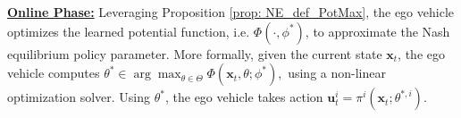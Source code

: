 \vspace{1mm}
\noindent \underline{\textbf{Online Phase:}} Leveraging Proposition \ref{prop: NE_def_PotMax}, the ego vehicle optimizes the learned potential function, i.e. \(\Phi(\cdot, \phi^\ast)\), to approximate the Nash equilibrium policy parameter. More formally, given the current state \(\mathbf{x}_t\), the ego vehicle computes 
\(
    \theta^\ast \in \arg\max_{\theta\in\Theta}\Phi(\mathbf{x}_t, \theta;\phi^\ast),
\)
using a non-linear optimization solver. 
Using \(\theta^\ast\), the ego vehicle takes action \(\mathbf{u}_t^i = \pi^i(\mathbf{x}_t; \theta^{\ast, i})\). 

 
